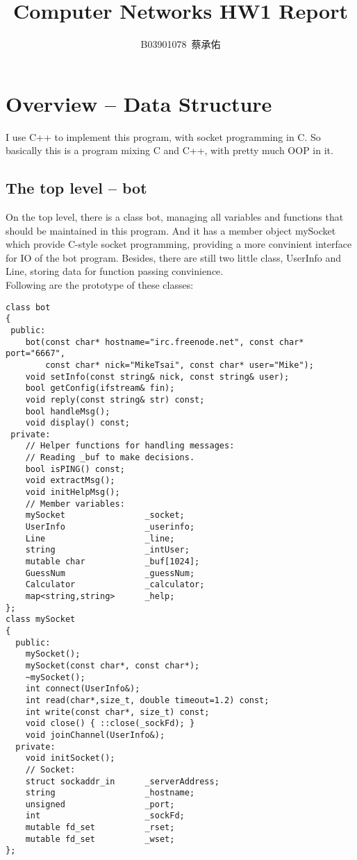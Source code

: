 \documentclass{article}
\author{B03901078\, 蔡承佑}
\title{Computer Networks HW1 Report}
\date{}
\begin{document}
\maketitle
\newcommand{\red}[1]{\textcolor{red}{#1}}
\newcommand{\br}[1]{\left( #1 \right)}
\newcommand{\sbr}[1]{\left[ #1 \right]}
\section{Overview -- Data Structure}
I use C++ to implement this program, with socket programming in C. So basically this is a program
mixing C and C++, with pretty much OOP in it.\\
\subsection{The top level -- {\cs bot}}
On the top level, there is a class {\cs bot}, managing all variables and functions that should be maintained
in this program. And it has a member object {\cs mySocket} which provide C-style socket programming, 
providing a more convinient interface for IO of the bot program.
Besides, there are still two little class, {\cs UserInfo} and {\cs Line}, storing data for function passing convinience.\\
\indent Following are the prototype of these classes:
\begin{framed}
\begin{verbatim}
class bot
{
 public:
    bot(const char* hostname="irc.freenode.net", const char* port="6667",
        const char* nick="MikeTsai", const char* user="Mike");
    void setInfo(const string& nick, const string& user);
    bool getConfig(ifstream& fin);
    void reply(const string& str) const;
    bool handleMsg();
    void display() const;
 private:
    // Helper functions for handling messages:
    // Reading _buf to make decisions.
    bool isPING() const;
    void extractMsg();
    void initHelpMsg();
    // Member variables:
    mySocket                _socket;
    UserInfo                _userinfo;
    Line                    _line;
    string                  _intUser;
    mutable char            _buf[1024];
    GuessNum                _guessNum; 
    Calculator              _calculator;
    map<string,string>      _help;
};
class mySocket
{
  public:
    mySocket();
    mySocket(const char*, const char*);
    ~mySocket();
    int connect(UserInfo&);
    int read(char*,size_t, double timeout=1.2) const;
    int write(const char*, size_t) const;
    void close() { ::close(_sockFd); }
    void joinChannel(UserInfo&);
  private:
    void initSocket();
    // Socket:
    struct sockaddr_in      _serverAddress;
    string                  _hostname;
    unsigned                _port;
    int                     _sockFd;
    mutable fd_set          _rset;
    mutable fd_set          _wset;
};
\end{verbatim}
\end{framed}
\end{document}
